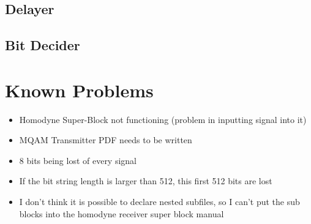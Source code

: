 \documentclass[a4paper]{article}
\begin{document}
\subsection{Delayer}


\subsection{Bit Decider}



\section{Known Problems}

\begin{itemize}
\item Homodyne Super-Block not functioning (problem in inputting signal into it)
\item MQAM Transmitter PDF needs to be written
\item 8 bits being lost of every signal
\item If the bit string length is larger than 512, this first 512 bits are lost
\item I don't think it is possible to declare nested subfiles, so I can't put the sub blocks into the homodyne receiver super block manual
\end{itemize}
\end{document}
